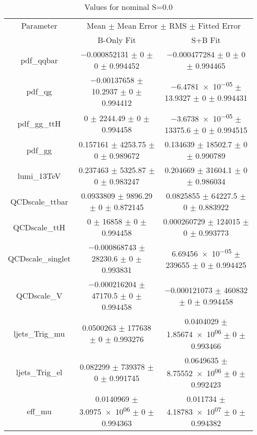 \begin{table}
\centering
\caption{Values for nominal S=0.0}
\begin{tabular}{ccc}
\toprule
Parameter & \multicolumn{2}{c}{Mean $\pm$ Mean Error $\pm$ RMS $\pm$ Fitted Error}\\
 & B-Only Fit & S+B Fit\\
\midrule
pdf\_qqbar & \num{-0.000852131} $\pm$ \num{0} $\pm$ \num{0} $\pm$ \num{0.994452} & \num{-0.000477284} $\pm$ \num{0} $\pm$ \num{0} $\pm$ \num{0.994465}\\
pdf\_qg & \num{-0.00137658} $\pm$ \num{10.2937} $\pm$ \num{0} $\pm$ \num{0.994412} & \num{-6.4781e-05} $\pm$ \num{13.9327} $\pm$ \num{0} $\pm$ \num{0.994431}\\
pdf\_gg\_ttH & \num{0} $\pm$ \num{2244.49} $\pm$ \num{0} $\pm$ \num{0.994458} & \num{-3.6738e-05} $\pm$ \num{13375.6} $\pm$ \num{0} $\pm$ \num{0.994515}\\
pdf\_gg & \num{0.157161} $\pm$ \num{4253.75} $\pm$ \num{0} $\pm$ \num{0.989672} & \num{0.134639} $\pm$ \num{18502.7} $\pm$ \num{0} $\pm$ \num{0.990789}\\
lumi\_13TeV & \num{0.237463} $\pm$ \num{5325.87} $\pm$ \num{0} $\pm$ \num{0.983247} & \num{0.204669} $\pm$ \num{31604.1} $\pm$ \num{0} $\pm$ \num{0.986034}\\
QCDscale\_ttbar & \num{0.0933809} $\pm$ \num{9896.29} $\pm$ \num{0} $\pm$ \num{0.872145} & \num{0.0825855} $\pm$ \num{64227.5} $\pm$ \num{0} $\pm$ \num{0.883922}\\
QCDscale\_ttH & \num{0} $\pm$ \num{16858} $\pm$ \num{0} $\pm$ \num{0.994458} & \num{0.000260729} $\pm$ \num{124015} $\pm$ \num{0} $\pm$ \num{0.993773}\\
QCDscale\_singlet & \num{-0.000868743} $\pm$ \num{28230.6} $\pm$ \num{0} $\pm$ \num{0.993831} & \num{6.69456e-05} $\pm$ \num{239655} $\pm$ \num{0} $\pm$ \num{0.994425}\\
QCDscale\_V & \num{-0.000216204} $\pm$ \num{47170.5} $\pm$ \num{0} $\pm$ \num{0.994458} & \num{-0.000121073} $\pm$ \num{460832} $\pm$ \num{0} $\pm$ \num{0.994458}\\
ljets\_Trig\_mu & \num{0.0500263} $\pm$ \num{177638} $\pm$ \num{0} $\pm$ \num{0.993276} & \num{0.0404029} $\pm$ \num{1.85674e+06} $\pm$ \num{0} $\pm$ \num{0.993466}\\
ljets\_Trig\_el & \num{0.082299} $\pm$ \num{739378} $\pm$ \num{0} $\pm$ \num{0.991745} & \num{0.0649635} $\pm$ \num{8.75552e+06} $\pm$ \num{0} $\pm$ \num{0.992423}\\
eff\_mu & \num{0.0140969} $\pm$ \num{3.0975e+06} $\pm$ \num{0} $\pm$ \num{0.994363} & \num{0.011734} $\pm$ \num{4.18783e+07} $\pm$ \num{0} $\pm$ \num{0.994382}\\

\end{tabular}
\end{table}
